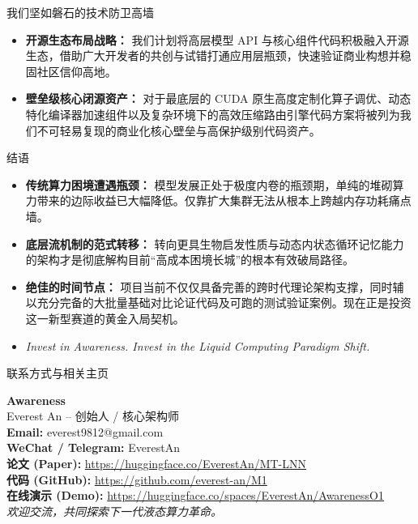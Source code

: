 ﻿\documentclass[aspectratio=169, 10pt]{beamer}
\begin{document}
\begin{frame}{我们坚如磐石的技术防卫高墙}
\begin{itemize}
    \item \textbf{开源生态布局战略：} 我们计划将高层模型 API 与核心组件代码积极融入开源生态，借助广大开发者的共创与试错打通应用层瓶颈，快速验证商业构想并稳固社区信仰高地。
    \item \textbf{壁垒级核心闭源资产：} 对于最底层的 CUDA 原生高度定制化算子调优、动态特化编译器加速组件以及复杂环境下的高效压缩路由引擎代码方案将被列为我们不可轻易复现的商业化核心壁垒与高保护级别代码资产。
\end{itemize}
\end{frame}

\begin{frame}{结语}
\begin{itemize}
    \item \textbf{传统算力困境遭遇瓶颈：} 模型发展正处于极度内卷的瓶颈期，单纯的堆砌算力带来的边际收益已大幅降低。仅靠扩大集群无法从根本上跨越内存功耗痛点墙。
    \item \textbf{底层流机制的范式转移：} 转向更具生物启发性质与动态内状态循环记忆能力的架构才是彻底解构目前“高成本困境长城”的根本有效破局路径。
    \item \textbf{绝佳的时间节点：} 项目当前不仅仅具备完善的跨时代理论架构支撑，同时辅以充分完备的大批量基础对比论证代码及可跑的测试验证案例。现在正是投资这一新型赛道的黄金入局契机。
    \vspace{0.5em}
    \item \textit{Invest in Awareness. Invest in the Liquid Computing Paradigm Shift.}
\end{itemize}
\end{frame}

\begin{frame}{联系方式与相关主页}
\begin{center}
    \LARGE \textbf{Awareness} \\
    \vspace{0.5em}
    \large Everest An -- 创始人 / 核心架构师 \\
    \vspace{1.5em}
    \normalsize
    \textbf{Email:} everest9812@gmail.com \\
    \textbf{WeChat / Telegram:} EverestAn \\
    \vspace{1.5em}
    \small
    \textbf{论文 (Paper):} \url{https://huggingface.co/EverestAn/MT-LNN} \\
    \textbf{代码 (GitHub):} \url{https://github.com/everest-an/M1} \\
    \textbf{在线演示 (Demo):} \url{https://huggingface.co/spaces/EverestAn/AwarenessO1} \\
    \vspace{1.5em}
    \textit{欢迎交流，共同探索下一代液态算力革命。}
\end{center}
\end{frame}
\end{document}

